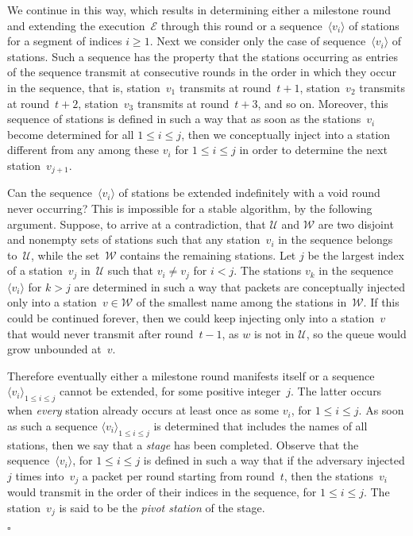 \documentclass[11pt]{article}
\newcommand{\cE}{\mathcal{E}}
\newcommand{\cU}{\mathcal{U}}
\newcommand{\cW}{\mathcal{W}}
\newcommand{\qed}{\hfill $\square$ \smallbreak}
\newenvironment{proof}{\noindent{\bf Proof:}}{\qed}
\begin{document}
\begin{proof}
We continue in this way, which results in determining either a milestone round and extending the execution~$\cE$ through this round or a sequence~$\langle v_i\rangle $ of stations for a  segment of indices $i\ge 1$.
Next we consider only the case of sequence~$\langle v_i\rangle $ of stations.
Such a sequence has the property that the stations occurring as entries of the sequence transmit at consecutive rounds in the order in which they occur in the sequence, that is, station~$v_1$ transmits at round~$t+1$, station~$v_2$ transmits at round~$t+2$, station~$v_3$ transmits at round~$t+3$, and so on.
Moreover, this sequence of stations is defined in such a way that as soon as the stations~$v_i$ become determined for all $1\le i\le j$, then we conceptually inject into a station different from any among these $v_i$ for $1\le i\le j$ in order to determine the next station~$v_{j+1}$.

Can the sequence~$\langle v_i\rangle $ of stations be extended indefinitely with a void round never occurring?
This is impossible for a stable algorithm, by the following argument.
Suppose, to arrive at a contradiction, that $\cU$ and $\cW$ are two disjoint and nonempty sets of stations such that any station~$v_i$ in the sequence belongs to~$\cU$, while the set~$\cW$ contains the remaining stations.
Let $j$ be the largest index of a station~$v_j$ in~$\cU$ such that $v_i\ne v_j$ for $i<j$.
The stations $v_{k}$ in the sequence~$\langle v_i\rangle $ for $k>j$ are determined in such a way that packets are conceptually injected only into a station~$v\in \cW$ of the smallest name among the stations in~$\cW$.
If this could be continued forever, then we could keep injecting only into a station~$v$ that would never transmit after round~$t-1$, as $w$ is not in $\cU$, so the queue would grow unbounded at~$v$.

Therefore eventually either a milestone round manifests itself or a sequence $\langle v_i\rangle_{1\le i\le j}$ cannot be extended, for some positive integer~$j$.
The latter occurs when \emph{every} station already occurs at least once as some $v_i$, for $1\le i\le j$.
As soon as such a sequence $\langle v_i\rangle_{1\le i\le j}$ is determined that includes the names of all stations, then we say that a \emph{stage} has been completed.
Observe that the sequence~$\langle v_i\rangle$, for $1\le i\le j$ is defined in such a way that if the adversary injected $j$ times into~$v_j$ a packet per round starting from round~$t$, then the stations~$v_i$ would transmit in the order of their indices in the sequence, for $1\le i\le j$.
The station~$v_j$ is said to be the \emph{pivot station} of the stage.


\end{proof}
\end{document}
